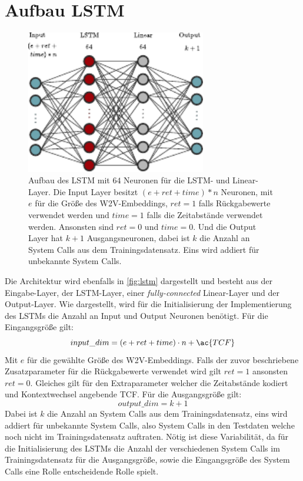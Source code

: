     \section{Aufbau LSTM}\label{sec:aufbau_lstm}
        \begin{figure}[ht]
            \centering
            \includegraphics[width=0.7\textwidth]{images/lstm.pdf}
            \caption[Aufbau des \ac{LSTM}]{Aufbau des \ac{LSTM} mit $64$ Neuronen für die \ac{LSTM}- und Linear-Layer.
                Die Input Layer besitzt $(e + ret + time) * n$ Neuronen, mit $e$ für die Größe des \ac{W2V}-Embeddings,
                $ret=1$ falls Rückgabewerte verwendet werden und $time=1$ falls die Zeitabstände verwendet werden.
                Ansonsten sind $ret=0$ und $time=0$.
                Und die Output Layer hat $k+1$ Ausgangsneuronen, dabei ist $k$ die Anzahl an System Calls aus dem Trainingsdatensatz.
                Eins wird addiert für unbekannte System Calls.}
                \label{fig:lstm}
        \end{figure}

        Die Architektur wird ebenfalls in \autoref{fig:lstm} dargestellt und besteht aus der Eingabe-Layer, der \ac{LSTM}-Layer, einer \textit{fully-connected} Linear-Layer und der Output-Layer.
        Wie dargestellt, wird für die Initialisierung der Implementierung des \acp{LSTM} die Anzahl an Input und Output Neuronen benötigt.
        Für die Eingangsgröße gilt:
        \begin{equation}
            input\_dim = (e + ret + time) \cdot n + \ac{TCF}
        \end{equation}
        Mit $e$ für die gewählte Größe des \ac{W2V}-Embeddings.
        Falls der zuvor beschriebene Zusatzparameter für die Rückgabewerte verwendet wird gilt $ret=1$ ansonsten $ret=0$.
        Gleiches gilt für den Extraparameter welcher die Zeitabstände kodiert und Kontextwechsel angebende \ac{TCF}.
        Für die Ausgangsgröße gilt:
        \begin{equation}
            output\_dim = k + 1
        \end{equation}
        Dabei ist $k$ die Anzahl an System Calls aus dem Trainingsdatensatz, eins wird addiert für unbekannte System Calls, also System Calls in den Testdaten welche noch nicht im Trainingsdatensatz auftraten.
        Nötig ist diese Variabilität, da für die Initialisierung des \acp{LSTM} die Anzahl der verschiedenen System Calls im Trainingsdatensatz für die Ausgangsgröße, sowie die Eingangsgröße des System Calls eine Rolle entscheidende Rolle spielt.

